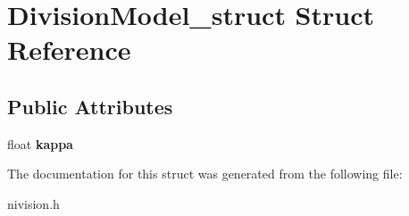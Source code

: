 \hypertarget{structDivisionModel__struct}{
\section{DivisionModel\_\-struct Struct Reference}
\label{structDivisionModel__struct}
}
\subsection*{Public Attributes}
\begin{DoxyCompactItemize}
\item 
\hypertarget{structDivisionModel__struct_a1b8d2e60a66fbcef33f83a75d1c98aa1}{
float {\bfseries kappa}}
\label{structDivisionModel__struct_a1b8d2e60a66fbcef33f83a75d1c98aa1}

\end{DoxyCompactItemize}


The documentation for this struct was generated from the following file:\begin{DoxyCompactItemize}
\item 
nivision.h\end{DoxyCompactItemize}
